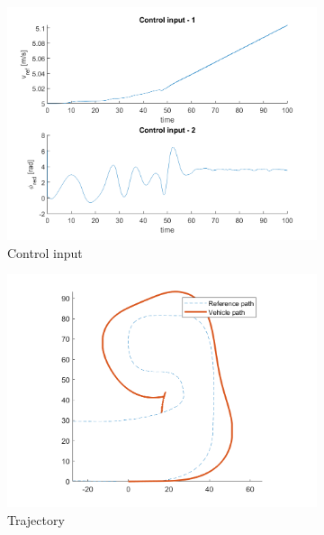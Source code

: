 \begin{figure}[H]
    \centering
     \begin{subfigure}[b]{0.45\textwidth}
         \centering
         \includegraphics[width=\textwidth]{Latex report/image/ex2/input2.png}
         \caption{Control input}
         \label{fig:2input}
     \end{subfigure}
     \begin{subfigure}[b]{0.45\textwidth}
         \centering
         \includegraphics[width=\textwidth]{Latex report/image/ex2/trajectory2.png}
         \caption{Trajectory}
         \label{fig:2traj}
     \end{subfigure}
     \begin{subfigure}[b]{0.8\textwidth}

\end{subfigure}
\end{figure}
